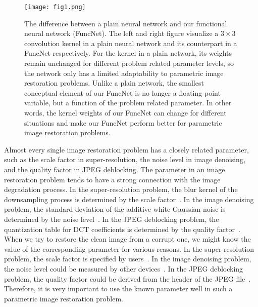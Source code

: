 \documentclass{article}
\begin{document}
\begin{figure}
\begin{center}
\texttt{[image: fig1.png]}
\end{center}
   \caption{The difference between a plain neural network and our functional neural network (FuncNet). The left and right figure visualize a $3\times3$ convolution kernel in a plain neural network and its counterpart in a FuncNet respectively. For the kernel in a plain network, its weights remain unchanged for different problem related parameter levels, so the network only has a limited adaptability to parametric image restoration problems. Unlike a plain network, the smallest conceptual element of our FuncNet is no longer a floating-point variable, but a function of the problem related parameter. In other words, the kernel weights of our FuncNet can change for different situations and make our FuncNet perform better for parametric image restoration problems.
}
\label{fig:1}
\end{figure}

Almost every single image restoration problem has a closely related parameter, such as the scale factor in super-resolution, the noise level in image denoising, and the quality factor in JPEG deblocking. The parameter in an image restoration problem tends to have a strong connection with the image degradation process. In the super-resolution problem, the blur kernel of the downsampling process is determined by the scale factor~\cite{zhang2020deep}. In the image denoising problem, the standard deviation of the additive white Gaussian noise is determined by the noise level~\cite{dabov2007image}. In the JPEG deblocking problem, the quantization table for DCT coefficients is determined by the quality factor~\cite{pennebaker1992jpeg}. When we try to restore the clean image from a corrupt one, we might know the value of the corresponding parameter for various reasons. In the super-resolution problem, the scale factor is specified by users~\cite{kim2016accurate}. In the image denoising problem, the noise level could be measured by other devices~\cite{pyatykh2012image,liu2013single}. In the JPEG deblocking problem, the quality factor could be derived from the header of the JPEG file~\cite{cogranne2018determining}. Therefore, it is very important to use the known parameter well in such a parametric image restoration problem.
\end{document}
